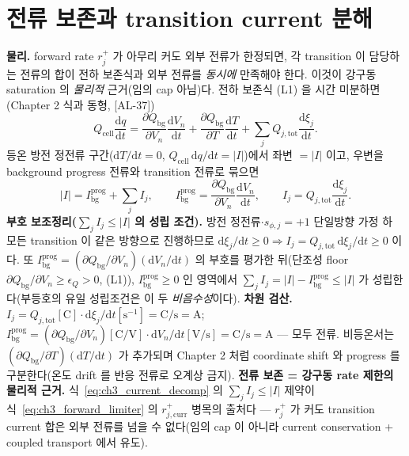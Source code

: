 \documentclass[11pt,a4paper]{article}
\newcommand{\dd}{\mathrm{d}}
\newcommand{\bg}{\mathrm{bg}}
\newcommand{\cell}{\mathrm{cell}}
\newcommand{\tot}{\mathrm{tot}}
\newcommand{\curr}{\mathrm{curr}}
\newcommand{\AL}[1]{\textsf{[AL-#1]}}
\begin{document}
\section{전류 보존과 transition current 분해}\label{sec:ch3_current}
\textbf{물리.} forward rate $r_j^+$ 가 아무리 커도 외부 전류가 한정되면, 각 transition 이 담당하는 전류의 합이
전하 보존식과 외부 전류를 \emph{동시에} 만족해야 한다. 이것이 강구동 saturation 의 \emph{물리적} 근거(임의 cap
아님)다. 전하 보존식 (L1) 을 시간 미분하면(Chapter 2 식과 동형, \AL{37})
\begin{equation}
Q_\cell\frac{\dd q}{\dd t}=\frac{\partial Q_\bg}{\partial V_n}\frac{\dd V_n}{\dd t}+\frac{\partial Q_\bg}{\partial T}\frac{\dd T}{\dd t}+\sum_j Q_{j,\tot}\frac{\dd\xi_j}{\dd t}.
\label{eq:ch3_current_balance}
\end{equation}
등온 방전 정전류 구간($\dd T/\dd t=0$, $Q_\cell\,\dd q/\dd t=|I|$)에서 좌변 $=|I|$ 이고, 우변을 background
progress 전류와 transition 전류로 묶으면
\begin{equation}
|I|=I_\bg^{\mathrm{prog}}+\sum_j I_j,\qquad I_\bg^{\mathrm{prog}}=\frac{\partial Q_\bg}{\partial V_n}\frac{\dd V_n}{\dd t},\qquad I_j=Q_{j,\tot}\frac{\dd\xi_j}{\dd t}.
\label{eq:ch3_current_decomp}
\end{equation}
\textbf{부호 보조정리($\sum_j I_j\le|I|$ 의 성립 조건).} 방전 정전류$\cdot$$s_{\phi,j}=+1$ 단일방향 가정 하
모든 transition 이 같은 방향으로 진행하므로 $\dd\xi_j/\dd t\ge0\Rightarrow I_j=Q_{j,\tot}\,\dd\xi_j/\dd t\ge0$ 이다.
또 $I_\bg^{\mathrm{prog}}=(\partial Q_\bg/\partial V_n)(\dd V_n/\dd t)$ 의 부호를 평가한 뒤(단조성 floor
$\partial Q_\bg/\partial V_n\ge\epsilon_Q>0$, (L1)), $I_\bg^{\mathrm{prog}}\ge0$ 인 영역에서
$\sum_j I_j=|I|-I_\bg^{\mathrm{prog}}\le|I|$ 가 성립한다(부등호의 유일 성립조건은 이 두 \emph{비음수성}이다).
\textbf{차원 검산.} $I_j=Q_{j,\tot}[\mathrm C]\cdot\dd\xi_j/\dd t[\mathrm{s^{-1}}]=\mathrm{C/s}=\mathrm A$;
$I_\bg^{\mathrm{prog}}=(\partial Q_\bg/\partial V_n)[\mathrm{C/V}]\cdot\dd V_n/\dd t[\mathrm{V/s}]=\mathrm{C/s}=\mathrm A$
— 모두 전류. 비등온서는 $(\partial Q_\bg/\partial T)(\dd T/\dd t)$ 가 추가되며 Chapter 2 처럼 coordinate shift
와 progress 를 구분한다(온도 drift 를 반응 전류로 오계상 금지).
\textbf{전류 보존 = 강구동 rate 제한의 물리적 근거.} 식~\eqref{eq:ch3_current_decomp} 의 $\sum_j I_j\le|I|$
제약이 식~\eqref{eq:ch3_forward_limiter} 의 $r_{j,\curr}^+$ 병목의 출처다 — $r_j^+$ 가 커도 transition current
합은 외부 전류를 넘을 수 없다(임의 cap 이 아니라 current conservation + coupled transport 에서 유도).
\end{document}
